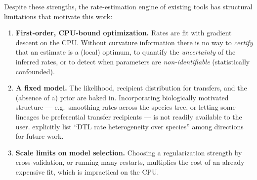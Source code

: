 \documentclass[11pt]{article}
\begin{document}
Despite these strengths, the rate-estimation engine of existing tools has
structural limitations that motivate this work:
\begin{enumerate}[leftmargin=1.4em,itemsep=2pt]
\item \textbf{First-order, CPU-bound optimization.} Rates are fit with
gradient descent on the CPU. Without curvature information there is no way to
\emph{certify} that an estimate is a (local) optimum, to quantify the
\emph{uncertainty} of the inferred rates, or to detect when parameters are
\emph{non-identifiable} (statistically confounded).
\item \textbf{A fixed model.} The likelihood, recipient distribution for
transfers, and the (absence of a) prior are baked in. Incorporating
biologically motivated structure --- e.g.\ smoothing rates across the species
tree, or letting some lineages be preferential transfer recipients --- is not
readily available to the user. \citet{Morel2024} explicitly list ``DTL rate
heterogeneity over species'' among directions for future work.
\item \textbf{Scale limits on model selection.} Choosing a regularization
strength by cross-validation, or running many restarts, multiplies the cost of
an already expensive fit, which is impractical on the CPU.
\end{enumerate}
\end{document}
